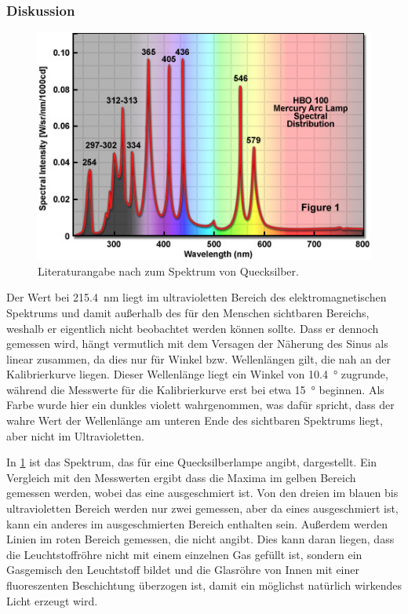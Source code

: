 \documentclass[
	a4paper,
	12pt,
	pagesize,
	ngerman
]{scrartcl}
\begin{document}
	\subsubsection{Diskussion}
	\begin{figure}[H] 
		\includegraphics[width=1\textwidth]{fig_quecksilber_lit} %
		\centering
		\caption{Literaturangabe nach \cite{Quecksilber} zum Spektrum von Quecksilber.}
		\label{fig_quecksilber}
		\centering
	\end{figure}

	Der Wert bei \SI{215,4}{\nano \meter} liegt im ultravioletten Bereich des elektromagnetischen Spektrums und damit außerhalb des für den Menschen sichtbaren Bereichs, weshalb er eigentlich nicht beobachtet werden können sollte.
	Dass er dennoch gemessen wird, hängt vermutlich mit dem Versagen der Näherung des Sinus als linear zusammen, da dies nur für Winkel bzw. Wellenlängen gilt, die nah an der Kalibrierkurve liegen.
	Dieser Wellenlänge liegt ein Winkel von \SI{10,4}{\degree} zugrunde, während die Messwerte für die Kalibrierkurve erst bei etwa \SI{15}{\degree} beginnen.
	Als Farbe wurde hier ein dunkles violett wahrgenommen, was dafür spricht, dass der wahre Wert der Wellenlänge am unteren Ende des sichtbaren Spektrums liegt, aber nicht im Ultravioletten.
	
	In \cref{fig_quecksilber} ist das Spektrum, das \cite{Quecksilber} für eine Quecksilberlampe angibt, dargestellt. Ein Vergleich mit den Messwerten ergibt dass die Maxima im gelben Bereich gemessen werden, wobei das eine ausgeschmiert ist. %
	Von den dreien im blauen bis ultravioletten Bereich werden nur zwei gemessen, aber da eines ausgeschmiert ist, kann ein anderes im ausgeschmierten Bereich enthalten sein.
	Außerdem werden Linien im roten Bereich gemessen, die \cite{Quecksilber} nicht angibt.
	Dies kann daran liegen, dass die Leuchtstoffröhre nicht mit einem einzelnen Gas gefüllt ist, sondern ein Gasgemisch den Leuchtstoff bildet und die Glasröhre von Innen mit einer fluoreszenten Beschichtung überzogen ist, damit ein möglichst natürlich wirkendes Licht erzeugt wird.
	
\end{document}
